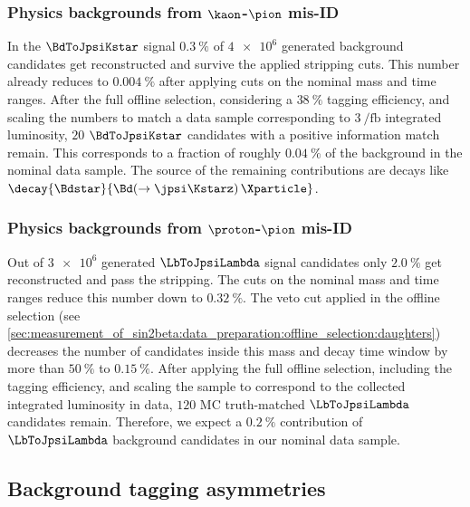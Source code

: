 \subsubsection{Physics backgrounds from $\kaon$-$\pion$ mis-ID}
\label{sec:measurement_of_sin2beta:physic_backgrounds:physic_backgrounds:kstar}

In the $\BdToJpsiKstar$ signal \MC $\SI{0.3}{\percent}$ of $\num{4e6}$ generated
background candidates get reconstructed and survive the applied stripping cuts.
This number already reduces to $\SI{0.004}{\percent}$ after applying cuts on the
nominal mass and time ranges. After the full offline selection, considering a
$\SI{38}{\percent}$ tagging efficiency, and scaling the numbers to match a data
sample corresponding to $\SI[separate-uncertainty=true]{3}{\per\femto\barn}$
integrated luminosity, $\num{20}$ $\BdToJpsiKstar$ candidates with a positive
\MC information match remain. This corresponds to a fraction of roughly
$\SI{0.04}{\percent}$ of the background in the nominal data sample. The source
of the remaining contributions are \eg decays like
$\decay{\Bdstar}{\Bd(\to\jpsi\Kstarz)\,\Xparticle}$.

\subsubsection{Physics backgrounds from $\proton$-$\pion$ mis-ID}
\label{sec:measurement_of_sin2beta:physic_backgrounds:physic_backgrounds:lambda}

Out of $\num{3e6}$ generated $\LbToJpsiLambda$ signal candidates only
$\SI{2.0}{\percent}$ get reconstructed and pass the stripping. The cuts on the
nominal mass and time ranges reduce this number down to $\SI{0.32}{\percent}$.
The veto cut applied in the offline selection (see
\cref{sec:measurement_of_sin2beta:data_preparation:offline_selection:daughters})
decreases the number of candidates inside this mass and decay time window by
more than $\SI{50}{\percent}$ to $\SI{0.15}{\percent}$. After applying the full
offline selection, including the tagging efficiency, and scaling the sample to
correspond to the collected integrated luminosity in data, $\num{120}$ MC
truth-matched $\LbToJpsiLambda$ candidates remain. Therefore, we expect a
$\SI{0.2}{\percent}$ contribution of $\LbToJpsiLambda$ background candidates in
our nominal data sample.

\subsection{Background tagging asymmetries}
\label{sec:measurement_of_sin2beta:physic_backgrounds:tagging_asymmetries}
